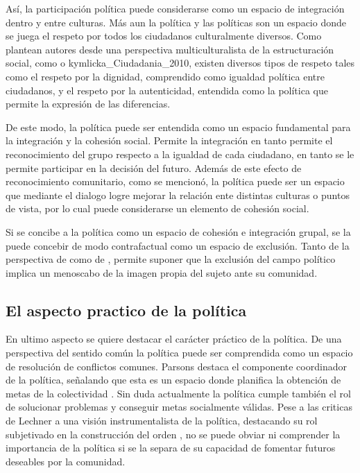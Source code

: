 \documentclass[12pt,twoside]{templates/facsothesis}
\begin{document}
Así, la participación política puede considerarse como un espacio de integración dentro y entre culturas. Más aun la política y las políticas son un espacio donde se juega el respeto por todos los ciudadanos culturalmente diversos. Como plantean autores desde una perspectiva multiculturalista de la estructuración social, como \citet{taylor_Multiculturalism_1992} o kymlicka\_Ciudadania\_2010, existen diversos tipos de respeto tales como el respeto por la dignidad, comprendido como igualdad política entre ciudadanos, y el respeto por la autenticidad, entendida como la política que permite la expresión de las diferencias.

De este modo, la política puede ser entendida como un espacio fundamental para la integración y la cohesión social. Permite la integración en tanto permite el reconocimiento del grupo respecto a la igualdad de cada ciudadano, en tanto se le permite participar en la decisión del futuro. Además de este efecto de reconocimiento comunitario, como se mencionó, la política puede ser un espacio que mediante el dialogo logre mejorar la relación ente distintas culturas o puntos de vista, por lo cual puede considerarse un elemento de cohesión social.

Si se concibe a la política como un espacio de cohesión e integración grupal, se la puede concebir de modo contrafactual como un espacio de exclusión. Tanto de la perspectiva de \citet{honneth_Lucha_1997} como de \citet{fraser_Fortunes_2020}, permite suponer que la exclusión del campo político implica un menoscabo de la imagen propia del sujeto ante su comunidad.

\hypertarget{el-aspecto-practico-de-la-poluxedtica}{%
\subsection{El aspecto practico de la política}\label{el-aspecto-practico-de-la-poluxedtica}}

En ultimo aspecto se quiere destacar el carácter práctico de la política. De una perspectiva del sentido común la política puede ser comprendida como un espacio de resolución de conflictos comunes. Parsons destaca el componente coordinador de la política, señalando que esta es un espacio donde planifica la obtención de metas de la colectividad \citet{chernilo_Sociedad_1999}. Sin duda actualmente la política cumple también el rol de solucionar problemas y conseguir metas socialmente válidas. Pese a las criticas de Lechner a una visión instrumentalista de la política, destacando su rol subjetivado en la construcción del orden \citep{jimenez_concepto_2012}, no se puede obviar ni comprender la importancia de la política si se la separa de su capacidad de fomentar futuros deseables por la comunidad.
\end{document}
